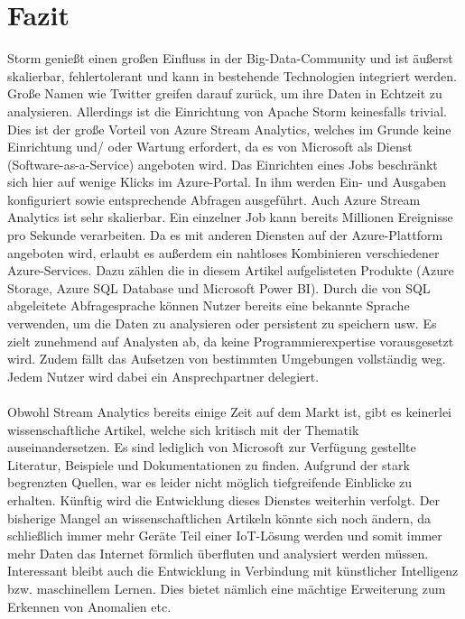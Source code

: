 \section{Fazit}
Storm genießt einen großen Einfluss in der Big-Data-Community und ist äußerst skalierbar, fehlertolerant und kann in bestehende Technologien integriert werden. Große Namen wie Twitter greifen darauf zurück, um ihre Daten in Echtzeit zu analysieren. Allerdings ist die Einrichtung von Apache Storm keinesfalls trivial. Dies ist der große Vorteil von Azure Stream Analytics, welches im Grunde keine Einrichtung und/ oder Wartung erfordert, da es von Microsoft als Dienst (Software-as-a-Service) angeboten wird. Das Einrichten eines Jobs beschränkt sich hier auf wenige Klicks im Azure-Portal. In ihm werden Ein- und Ausgaben konfiguriert sowie entsprechende Abfragen ausgeführt. Auch Azure Stream Analytics ist sehr skalierbar. Ein einzelner Job kann bereits Millionen Ereignisse pro Sekunde verarbeiten. Da es mit anderen Diensten auf der Azure-Plattform angeboten wird, erlaubt es außerdem ein nahtloses Kombinieren verschiedener Azure-Services. Dazu zählen die in diesem Artikel aufgelisteten Produkte (Azure Storage, Azure SQL Database und Microsoft Power BI). Durch die von SQL abgeleitete Abfragesprache können Nutzer bereits eine bekannte Sprache verwenden, um die Daten zu analysieren oder persistent zu speichern usw. Es zielt zunehmend auf Analysten ab, da keine Programmierexpertise vorausgesetzt wird. Zudem fällt das Aufsetzen von bestimmten Umgebungen vollständig weg. Jedem Nutzer wird dabei ein Ansprechpartner delegiert.\\ \\ Obwohl Stream Analytics bereits einige Zeit auf dem Markt ist, gibt es keinerlei wissenschaftliche Artikel, welche sich kritisch mit der Thematik auseinandersetzen. Es sind lediglich von Microsoft zur Verfügung gestellte Literatur, Beispiele und Dokumentationen zu finden. Aufgrund der stark begrenzten Quellen, war es leider nicht möglich tiefgreifende Einblicke zu erhalten. Künftig wird die Entwicklung dieses Dienstes weiterhin verfolgt. Der bisherige Mangel an wissenschaftlichen Artikeln könnte sich noch ändern, da schließlich immer mehr Geräte Teil einer IoT-Lösung werden und somit immer mehr Daten das Internet förmlich überfluten und analysiert werden müssen. Interessant bleibt auch die Entwicklung in Verbindung mit künstlicher Intelligenz bzw. maschinellem Lernen. Dies bietet nämlich eine mächtige Erweiterung zum Erkennen von Anomalien etc.




\ifCLASSOPTIONcaptionsoff
  \newpage
\fi